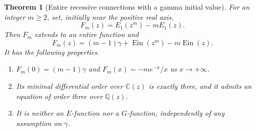 \documentclass[11pt,a4paper]{article}
\newtheorem{theorem}{Theorem}[section]
\theoremstyle{definition}
\theoremstyle{remark}
\numberwithin{equation}{section}
\begin{document}
\begin{theorem}[Entire recessive connections with a gamma initial value]
\label{p6:phn:ramification}
For an integer $m\geq2$, set, initially near the positive real axis,
\[
 F_m(z)=E_1(z^m)-mE_1(z).
\]
Then $F_m$ extends to an entire function and
\begin{equation}\label{p6:phn:ramification-identity}
 F_m(z)=(m-1)\gamma+\operatorname{Ein}(z^m)
                    -m\operatorname{Ein}(z).
\end{equation}
It has the following properties.
\begin{enumerate}
\item $F_m(0)=(m-1)\gamma$ and
      $F_m(x)\sim-m e^{-x}/x$ as $x\to+\infty$.
\item Its minimal differential order over $\mathbb C(z)$ is exactly
      three, and it admits an equation of order three over
      $\mathbb Q(z)$.
\item It is neither an $E$-function nor a $G$-function, independently
      of any assumption on $\gamma$.
\end{enumerate}
\end{theorem}
\end{document}
